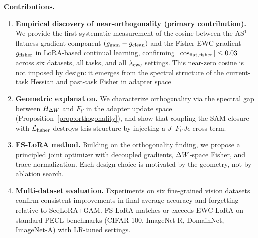 \textbf{Contributions.}
\begin{enumerate}
  \item \textbf{Empirical discovery of near-orthogonality (primary contribution).}
    We provide the first systematic measurement of the cosine between the AS$^1$ flatness gradient
    component $(g_{\mathrm{gam}} - g_{\mathrm{clean}})$ and the Fisher-EWC gradient $g_{\mathrm{fisher}}$
    in LoRA-based continual learning, confirming $|\cos_{\mathrm{flat,fisher}}| \leq 0.03$ across
    six datasets, all tasks, and all $\lambda_{\mathrm{ewc}}$ settings.
    This near-zero cosine is not imposed by design: it emerges from the spectral
    structure of the current-task Hessian and past-task Fisher in adapter space.
  \item \textbf{Geometric explanation.}
    We characterize orthogonality via the spectral gap between $H_{\Delta W}$ and $F_{t'}$
    in the adapter update space (Proposition~\ref{prop:orthogonality}), and show that
    coupling the SAM closure with $\mathcal{L}_{\mathrm{fisher}}$ destroys this structure by injecting
    a $J^\top F_{t'} J\epsilon$ cross-term.
  \item \textbf{FS-LoRA method.}
    Building on the orthogonality finding, we propose a principled joint optimizer with
    decoupled gradients, $\Delta W$-space Fisher, and trace normalization.
    Each design choice is motivated by the geometry, not by ablation search.
  \item \textbf{Multi-dataset evaluation.}
    Experiments on six fine-grained vision datasets confirm consistent improvements
    in final average accuracy and forgetting relative to SeqLoRA+GAM.
    FS-LoRA matches or exceeds EWC-LoRA on standard PECL benchmarks
    (CIFAR-100, ImageNet-R, DomainNet, ImageNet-A) with LR-tuned settings.
\end{enumerate}
